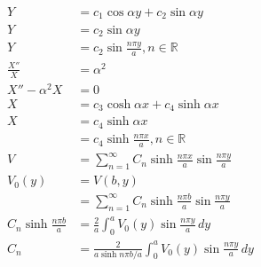 \documentclass{article}
\begin{document}
\begin{enumerate}
\begin{align*}
          Y                                                                     & = c_1 \cos \alpha y + c_2 \sin \alpha y                                      \\
          Y                                                                     & = c_2 \sin \alpha y                                                          \\
          Y                                                                     & = c_2 \sin \frac{n \pi y}{a}, n \in \mathbb{R}                               \\
          \frac{X''}{X}                                                         & = \alpha^2                                                                   \\
          X'' - \alpha^2 X                                                      & = 0                                                                          \\
          X                                                                     & = c_3 \cosh \alpha x + c_4 \sinh \alpha x                                    \\
          X                                                                     & = c_4 \sinh \alpha x                                                         \\
                                                                                & = c_4 \sinh \frac{n \pi x}{a}, n \in \mathbb{R}                              \\
          V                                                                     & = \sum_{n = 1}^\infty C_n \sinh \frac{n \pi x}{a} \sin \frac{n \pi y}{a}     \\
          V_0(y)                                                                & = V(b, y)                                                                    \\
                                                                                & = \sum_{n = 1}^\infty C_n \sinh \frac{n \pi b}{a} \sin \frac{n \pi y}{a}     \\
          C_n \sinh \frac{n \pi b}{a}                                           & = \frac{2}{a} \int_0^a V_0(y) \sin \frac{n \pi y}{a} \,d y                   \\
          C_n                                                                   & = \frac{2}{a \sinh n \pi b / a} \int_0^a V_0(y) \sin \frac{n \pi y}{a} \,d y
        \end{align*}


\end{enumerate}
\end{document}
